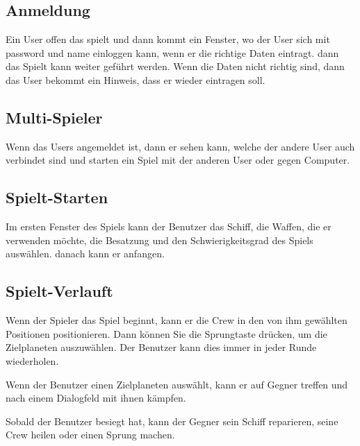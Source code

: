 \documentclass[fontsize=12pt,paper=a4,twoside]{scrartcl}
\begin{document}
\subsection{Anmeldung}
Ein User offen das spielt und dann kommt ein Fenster, wo der User sich  mit password und name einloggen  kann, wenn er die richtige Daten eintragt. dann das Spielt kann weiter geführt werden. Wenn die Daten nicht richtig sind, dann das User bekommt ein Hinweis, dass er wieder eintragen soll.
\subsection{Multi-Spieler}
Wenn das Users angemeldet ist, dann er sehen kann, welche der andere User auch verbindet sind und starten ein Spiel mit der anderen User oder gegen Computer.
\subsection{Spielt-Starten}
Im ersten Fenster des Spiels kann der Benutzer das Schiff, die Waffen, die er verwenden möchte, die Besatzung und den Schwierigkeitsgrad des Spiels auswählen. danach kann er anfangen.
\subsection{Spielt-Verlauft}
Wenn der Spieler das Spiel beginnt, kann er die Crew in den von ihm gewählten Positionen positionieren. Dann können Sie die Sprungtaste drücken, um die Zielplaneten auszuwählen. Der Benutzer kann dies immer in jeder Runde wiederholen.

Wenn der Benutzer einen Zielplaneten auswählt, kann er auf Gegner treffen und nach einem Dialogfeld mit ihnen kämpfen.

Sobald der Benutzer besiegt hat, kann der Gegner sein Schiff reparieren, seine Crew heilen oder einen Sprung machen.
\end{document}
